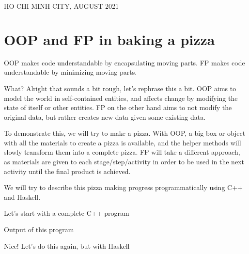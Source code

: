 \documentclass[a4paper]{article}
\numberwithin{equation}{section}
\begin{document}
\begin{titlepage}
  \begin{center}
    {\footnotesize HO CHI MINH CITY, AUGUST 2021}
  \end{center}
\end{titlepage}




\section{OOP and FP in baking a pizza}
OOP makes code understandable by encapsulating moving parts.
FP makes code understandable by minimizing moving parts.

What? Alright that sounds a bit rough, let's rephrase this a bit.
OOP aims to model the world in self-contained entities, and affects change by modifying the state of itself or other entities.
FP on the other hand aims to not modify the original data, but rather creates new data given some existing data.

To demonstrate this, we will try to make a pizza.
With OOP, a big box or object with all the materials to create a pizza is available, and the helper methods will slowly transform them into a complete pizza.
FP will take a different approach, as materials are given to each stage/step/activity in order to be used in the next activity until the final product is achieved.

We will try to describe this pizza making progress programmatically using C++ and Haskell.

Let's start with a complete C++ program

Output of this program

Nice! Let's do this again, but with Haskell
\end{document}
